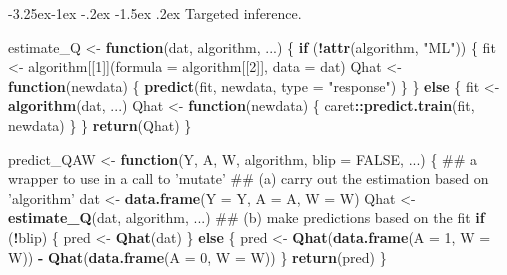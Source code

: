 \documentclass[]{article}
\makeatletter
\newenvironment{Shaded}{\begin{snugshade}}{\end{snugshade}}
\newcommand{\ControlFlowTok}[1]{\textcolor[rgb]{0.13,0.29,0.53}{\textbf{#1}}}
\newcommand{\DataTypeTok}[1]{\textcolor[rgb]{0.13,0.29,0.53}{#1}}
\newcommand{\DecValTok}[1]{\textcolor[rgb]{0.00,0.00,0.81}{#1}}
\newcommand{\KeywordTok}[1]{\textcolor[rgb]{0.13,0.29,0.53}{\textbf{#1}}}
\newcommand{\NormalTok}[1]{#1}
\newcommand{\OperatorTok}[1]{\textcolor[rgb]{0.81,0.36,0.00}{\textbf{#1}}}
\newcommand{\OtherTok}[1]{\textcolor[rgb]{0.56,0.35,0.01}{#1}}
\newcommand{\StringTok}[1]{\textcolor[rgb]{0.31,0.60,0.02}{#1}}
\renewcommand\subsection{\@startsection{subsection}{3}{\z@}%
                                     {-3.25ex\@plus -1ex \@minus -.2ex}%
                                     {-1.5ex \@plus .2ex}%
                                     {\normalfont\normalsize\bfseries}}
\theoremstyle{definition}
\theoremstyle{definition}
\theoremstyle{definition}
\theoremstyle{remark}
\makeatother
\begin{document}
\subsection{Targeted inference.}
\label{subsec:tmle}

\begin{Shaded}
\begin{Highlighting}[]
\NormalTok{estimate_Q <-}\StringTok{ }\ControlFlowTok{function}\NormalTok{(dat, algorithm, ...) \{}
  \ControlFlowTok{if}\NormalTok{ (}\OperatorTok{!}\KeywordTok{attr}\NormalTok{(algorithm, }\StringTok{"ML"}\NormalTok{)) \{}
\NormalTok{    fit <-}\StringTok{ }\NormalTok{algorithm[[}\DecValTok{1}\NormalTok{]](}\DataTypeTok{formula =}\NormalTok{ algorithm[[}\DecValTok{2}\NormalTok{]], }\DataTypeTok{data =}\NormalTok{ dat)}
\NormalTok{    Qhat <-}\StringTok{ }\ControlFlowTok{function}\NormalTok{(newdata) \{}
      \KeywordTok{predict}\NormalTok{(fit, newdata, }\DataTypeTok{type =} \StringTok{"response"}\NormalTok{)}
\NormalTok{    \}}
\NormalTok{  \} }\ControlFlowTok{else}\NormalTok{ \{}
\NormalTok{    fit <-}\StringTok{ }\KeywordTok{algorithm}\NormalTok{(dat, ...)}
\NormalTok{    Qhat <-}\StringTok{ }\ControlFlowTok{function}\NormalTok{(newdata) \{}
\NormalTok{      caret}\OperatorTok{::}\KeywordTok{predict.train}\NormalTok{(fit, newdata)}
\NormalTok{    \}    }
\NormalTok{  \}}
  \KeywordTok{return}\NormalTok{(Qhat)}
\NormalTok{\}}

\NormalTok{predict_QAW <-}\StringTok{ }\ControlFlowTok{function}\NormalTok{(Y, A, W, algorithm, }\DataTypeTok{blip =} \OtherTok{FALSE}\NormalTok{, ...) \{}
\NormalTok{  ## a wrapper to use in a call to 'mutate'}
\NormalTok{  ## (a) carry out the estimation based on 'algorithm'}
\NormalTok{  dat <-}\StringTok{ }\KeywordTok{data.frame}\NormalTok{(}\DataTypeTok{Y =}\NormalTok{ Y, }\DataTypeTok{A =}\NormalTok{ A, }\DataTypeTok{W =}\NormalTok{ W)}
\NormalTok{  Qhat <-}\StringTok{ }\KeywordTok{estimate_Q}\NormalTok{(dat, algorithm, ...)}
\NormalTok{  ## (b) make predictions based on the fit}
  \ControlFlowTok{if}\NormalTok{ (}\OperatorTok{!}\NormalTok{blip) \{}
\NormalTok{    pred <-}\StringTok{ }\KeywordTok{Qhat}\NormalTok{(dat)}
\NormalTok{  \} }\ControlFlowTok{else}\NormalTok{ \{}
\NormalTok{    pred <-}\StringTok{ }\KeywordTok{Qhat}\NormalTok{(}\KeywordTok{data.frame}\NormalTok{(}\DataTypeTok{A =} \DecValTok{1}\NormalTok{, }\DataTypeTok{W =}\NormalTok{ W)) }\OperatorTok{-}\StringTok{ }\KeywordTok{Qhat}\NormalTok{(}\KeywordTok{data.frame}\NormalTok{(}\DataTypeTok{A =} \DecValTok{0}\NormalTok{, }\DataTypeTok{W =}\NormalTok{ W))}
\NormalTok{  \}}
  \KeywordTok{return}\NormalTok{(pred)}
\NormalTok{\}}


\end{Highlighting}
\end{Shaded}
\end{document}
